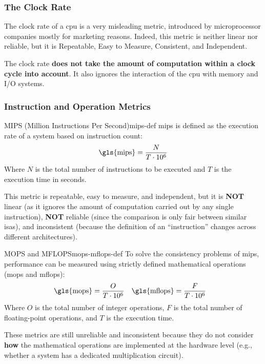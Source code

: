 \subsubsection{The Clock Rate}
The clock rate of a \gls{cpu} is a very misleading metric, introduced by microprocessor companies mostly for marketing reasons. Indeed, this metric is neither linear nor reliable, but it is Repeatable, Easy to Measure, Consistent, and Independent.

The clock rate \textbf{does not take the amount of computation within a clock cycle into account}. It also ignores the interaction of the \gls{cpu} with memory and I/O systems.

\subsubsection{Instruction and Operation Metrics}

\begin{definition}{MIPS (Million Instructions Per Second)}{mips-def}
    \gls{mips} is defined as the execution rate of a system based on instruction count:
    \[
        \text{\gls{mips}} = \frac{N}{T \cdot 10^6}
    \]
    Where \(N\) is the total number of instructions to be executed and \(T\) is the execution time in seconds.
\end{definition}
\noindent This metric is repeatable, easy to measure, and independent, but it is \textbf{NOT} linear (as it ignores the amount of computation carried out by any single instruction), \textbf{NOT} reliable (since the comparison is only fair between similar \glspl{isa}), and inconsistent (because the definition of an ``instruction'' changes across different architectures).

\begin{definition}{MOPS and MFLOPS}{mops-mflops-def}
    To solve the consistency problems of \gls{mips}, performance can be measured using strictly defined mathematical operations (\gls{mops} and \gls{mflops}):
    \begin{align*}
         \text{\gls{mops}} &= \frac{O}{T \cdot 10^6} & \text{\gls{mflops}} &= \frac{F}{T \cdot 10^6}
    \end{align*}
    Where \(O\) is the total number of integer operations, \(F\) is the total number of floating-point operations, and \(T\) is the execution time.
\end{definition}
\noindent These metrics are still unreliable and inconsistent because they do not consider \textbf{how} the mathematical operations are implemented at the hardware level (e.g., whether a system has a dedicated multiplication circuit).

